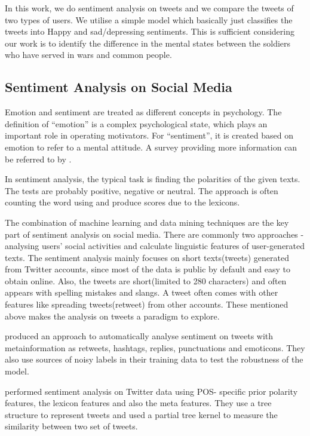 In this work, we do sentiment analysis on tweets and we compare the tweets of
two types of users. We utilise a simple model which basically just classifies
the tweets into Happy and sad/depressing sentiments. This is sufficient
considering our work is to identify the difference in the mental states between
the soldiers who have served in wars and common people.

\subsection{Sentiment Analysis on Social Media}

Emotion and sentiment are treated as different concepts in psychology. The
definition of \enquote{emotion} is a complex psychological state, which plays an
important role in operating motivators. For \enquote{sentiment}, it is created based on
emotion to refer to a mental attitude. A survey providing more information can
be referred to by \cite{yue2018survey}.

In sentiment analysis, the typical task is finding the polarities of the given
texts. The tests are probably positive, negative or neutral. The approach is
often counting the word using and produce scores due to the lexicons.

The combination of machine learning and data mining techniques are the key part
of sentiment analysis on social media. There are commonly two approaches -
analysing users' social activities and calculate linguistic features of
user-generated texts. The sentiment analysis mainly focuses on short texts(tweets)
generated from Twitter accounts, since most of the data is public by default and
easy to obtain online. Also, the tweets are short(limited to 280 characters) and
often appears with spelling mistakes and slangs. A tweet often comes with other
features like spreading tweets(retweet) from other accounts. These mentioned
above makes the analysis on tweets a paradigm to explore.

\cite{robustTwitter2010Luciano} produced an approach to automatically analyse
sentiment on tweets with metainformation as retweets, hashtags, replies,
punctuations and emoticons. They also use sources of noisy labels in their
training data to test the robustness of the model.

\cite{agarwal2011sentiment} performed sentiment analysis on Twitter data using POS-
specific prior polarity features, the lexicon features and also the meta
features. They use a tree structure to represent tweets and used a partial tree
kernel to measure the similarity between two set of tweets.

